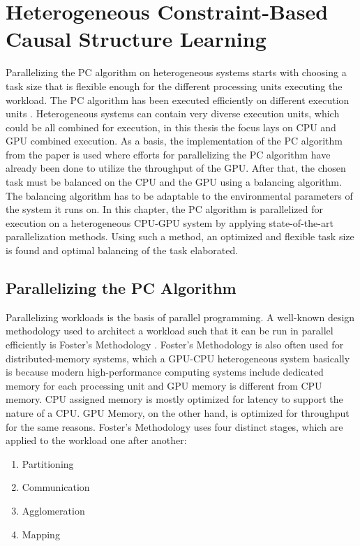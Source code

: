 \chapter{Heterogeneous Constraint-Based Causal Structure Learning}
Parallelizing the PC algorithm on heterogeneous systems starts with choosing a task size that is flexible enough for the different processing units executing the workload. The PC algorithm has been executed efficiently on different execution units \cite{leParallelPCPackageEfficient2015,leFastPCAlgorithm2019,schmidtOrderIndependentConstraintBasedCausal2018,zarebavaniCuPCCUDAbasedParallel2018}. Heterogeneous systems can contain very diverse execution units, which could be all combined for execution, in this thesis the focus lays on CPU and GPU combined execution. As a basis, the implementation of the PC algorithm from the paper \cite{schmidtOrderIndependentConstraintBasedCausal2018} is used where efforts for parallelizing the PC algorithm have already been done to utilize the throughput of the GPU. After that, the chosen task must be balanced on the CPU and the GPU using a balancing algorithm. The balancing algorithm has to be adaptable to the environmental parameters of the system it runs on. In this chapter, the PC algorithm is parallelized for execution on a heterogeneous CPU-GPU system by applying state-of-the-art parallelization methods. Using such a method, an optimized and flexible task size is found and optimal balancing of the task elaborated.

\section{Parallelizing the PC Algorithm}
Parallelizing workloads is the basis of parallel programming. A well-known design methodology used to architect a workload such that it can be run in parallel efficiently is Foster's Methodology \cite{fosterDesigningBuildingParallel1995}. Foster's Methodology is also often used for distributed-memory systems, which a GPU-CPU heterogeneous system basically is because modern high-performance computing systems include dedicated memory for each processing unit and GPU memory is different from CPU memory. CPU assigned memory is mostly optimized for latency to support the nature of a CPU. GPU Memory, on the other hand, is optimized for throughput for the same reasons. Foster's Methodology uses four distinct stages, which are applied to the workload one after another:

\begin{enumerate}
    \item Partitioning
    \item Communication
    \item Agglomeration 
    \item Mapping
\end{enumerate}

